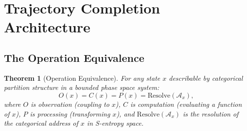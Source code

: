 \documentclass[twocolumn,10pt]{article}
\newtheorem{theorem}{Theorem}[section]
\theoremstyle{remark}
\begin{document}
\section{Trajectory Completion Architecture}
\label{sec:trajectory}

\subsection{The Operation Equivalence}

\begin{theorem}[Operation Equivalence]
\label{thm:operation_equiv}
For any state $x$ describable by categorical partition structure in a bounded phase space system:
\begin{equation}
O(x) = C(x) = P(x) = \mathrm{Resolve}(\mathcal{A}_x),
\label{eq:operation_equiv}
\end{equation}
where $O$ is observation (coupling to $x$), $C$ is computation (evaluating a function of $x$), $P$ is processing (transforming $x$), and $\mathrm{Resolve}(\mathcal{A}_x)$ is the resolution of the categorical address of $x$ in S-entropy space.
\end{theorem}
\end{document}
